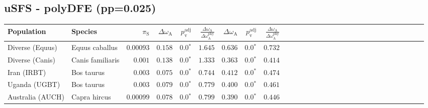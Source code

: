 \subsection{uSFS - polyDFE (pp=0.025)} 
\begin{center}
\begin{adjustbox}{width = 1\textwidth}
\begin{tabular}{|l|l|r|r|r|r|r|r|r|r|r|r|r|r|r|r|r|r|r|r|r|r|r|r|r|r|r|r|r|}
\toprule
                     Population &              Species & $\pi_{\textrm{S}}$ & $\Delta \omega_{\mathrm{A}} $ & $p_{\mathrm{v}}^{\mathrm{adj}}$ & $\frac{\Delta\omega_{\mathrm{A}}}{\Delta\omega_{\mathrm{A}}^{\mathrm{phy}}}$ & $\Delta \omega_{\mathrm{A}} $ & $p_{\mathrm{v}}^{\mathrm{adj}}$ & $\frac{\Delta\omega_{\mathrm{A}}}{\Delta\omega_{\mathrm{A}}^{\mathrm{phy}}}$ \\
\midrule
                Diverse (Equus) &       Equus caballus &          $0.00093$ &                      $ 0.158$ &                  $\bm{0.0{^*}}$ &                                           $ 1.645$ &                      $ 0.636$ &                  $\bm{0.0{^*}}$ &                                           $ 0.732$ \\
                Diverse (Canis) &     Canis familiaris &           $ 0.001$ &                      $ 0.138$ &                  $\bm{0.0{^*}}$ &                                           $ 1.333$ &                      $ 0.363$ &                  $\bm{0.0{^*}}$ &                                           $ 0.414$ \\
                    Iran (IRBT) &           Bos taurus &           $ 0.003$ &                      $ 0.075$ &                  $\bm{0.0{^*}}$ &                                           $ 0.744$ &                      $ 0.412$ &                  $\bm{0.0{^*}}$ &                                           $ 0.474$ \\
                  Uganda (UGBT) &           Bos taurus &           $ 0.003$ &                      $ 0.079$ &                  $\bm{0.0{^*}}$ &                                           $ 0.779$ &                      $ 0.400$ &                  $\bm{0.0{^*}}$ &                                           $ 0.461$ \\
               Australia (AUCH) &         Capra hircus &          $0.00099$ &                      $ 0.078$ &                  $\bm{0.0{^*}}$ &                                           $ 0.799$ &                      $ 0.390$ &                  $\bm{0.0{^*}}$ &                                           $ 0.446$ \\

\end{tabular}
\end{adjustbox}
\end{center}
